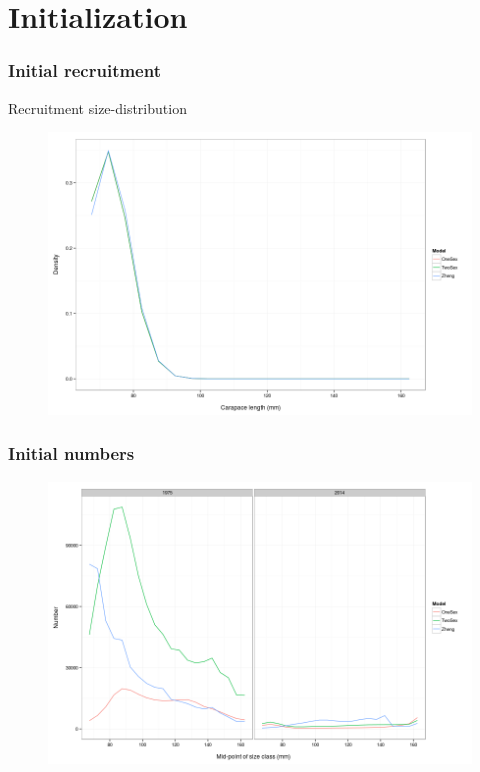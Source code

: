 \documentclass{beamer}
\begin{document}

\section{Initialization}


\begin{frame}
\frametitle{Initial recruitment}
Recruitment size-distribution
\begin{figure}[!htbp]
  \centering
  \includegraphics[width=0.6\linewidth]{figure/init_rec-1.png}
\end{figure}
\end{frame}


\begin{frame}
\frametitle{Initial numbers}
\begin{figure}[!htbp]
  \centering
  \includegraphics[width=0.6\linewidth]{figure/init_N-1.png}
\end{figure}
\end{frame}

\end{document}
